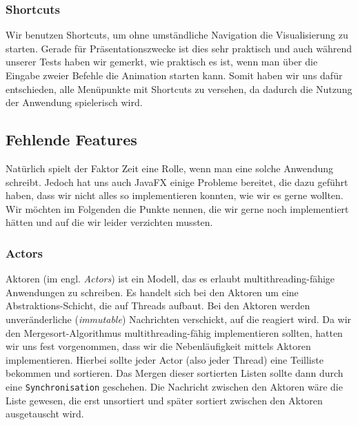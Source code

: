 \subsubsection{Shortcuts}
Wir benutzen Shortcuts, um ohne umständliche Navigation die Visualisierung zu starten. Gerade für Präsentationszwecke ist dies sehr praktisch und auch während unserer Tests haben wir gemerkt, wie praktisch es ist, wenn man über die Eingabe zweier Befehle die Animation starten kann. Somit haben wir uns dafür entschieden, alle Menüpunkte mit Shortcuts zu versehen, da dadurch die Nutzung der Anwendung spielerisch wird.

\subsection{Fehlende Features}
Natürlich spielt der Faktor Zeit eine Rolle, wenn man eine solche Anwendung schreibt. Jedoch hat uns auch JavaFX einige Probleme bereitet, die dazu geführt haben, dass wir nicht alles so implementieren konnten, wie wir es gerne wollten. Wir möchten im Folgenden die Punkte nennen, die wir gerne noch implementiert hätten und auf die wir leider verzichten mussten.

\subsubsection{Actors}\label{sec:probleme-mit-aktoren}
Aktoren (im engl. \textit{Actors}) ist ein Modell, das es erlaubt multithreading-fähige Anwendungen zu schreiben. Es handelt sich bei den Aktoren um eine Abstraktions-Schicht, die auf Threads aufbaut. Bei den Aktoren werden unveränderliche (\textit{immutable}) Nachrichten verschickt, auf die reagiert wird. Da wir den Mergesort-Algorithmus multithreading-fähig implementieren sollten, hatten wir uns fest vorgenommen, dass wir die Nebenläufigkeit mittels Aktoren implementieren. Hierbei sollte jeder Actor (also jeder Thread) eine Teilliste bekommen und sortieren. Das Mergen dieser sortierten Listen sollte dann durch eine \texttt{Synchronisation} geschehen. Die Nachricht zwischen den Aktoren wäre die Liste gewesen, die erst unsortiert und später sortiert zwischen den Aktoren ausgetauscht wird.

